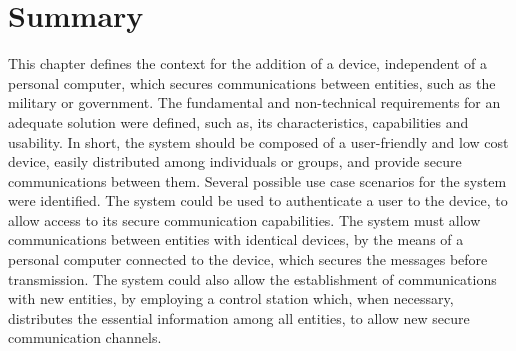 



\section*{Summary}\label{chap:problem:summary}

This chapter defines the context for the addition of a device, independent of a personal computer, which secures communications between entities, such as the military or government.
The fundamental and non-technical requirements for an adequate solution were defined, such as, its characteristics, capabilities and usability. In short, the system should be composed of a user-friendly and low cost device, easily distributed among individuals or groups, and provide secure communications between them.
Several possible use case scenarios for the system were identified.
The system could be used to authenticate a user to the device, to allow access to its secure communication capabilities. The system must allow communications between entities with identical devices, by the means of a personal computer connected to the device, which secures the messages before transmission.
The system could also allow the establishment of communications with new entities, by employing a control station which, when necessary, distributes the essential information among all entities, to allow new secure communication channels.
